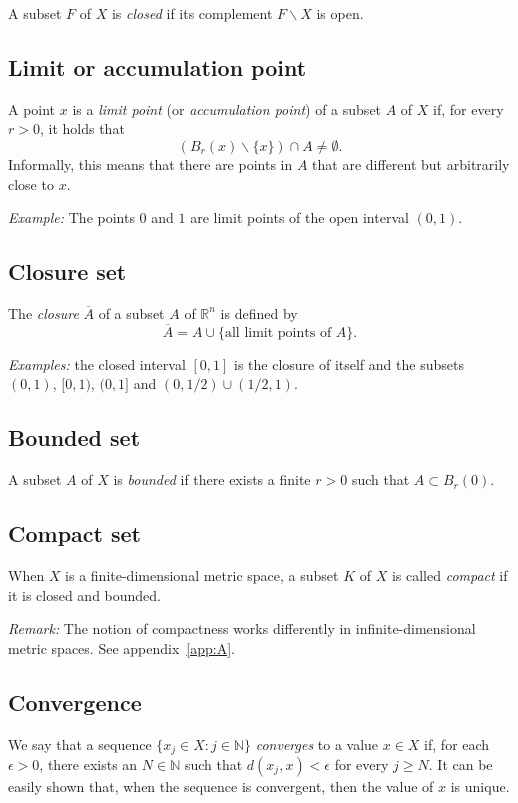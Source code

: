 \documentclass[aps,prl,twocolumn,groupedaddress]{revtex4-2}
\newcommand{\NN}{\mathbb{N}}
\newcommand{\RR}{\mathbb{R}}
\begin{document}
A subset $F$ of $X$ is {\em closed} if its complement $F\backslash X$ is open.

\subsection{
Limit or accumulation point
\label{sec:limit_point_metric}
}

A point $x$ is a {\em limit point} (or {\em accumulation point}) of a subset $A$ of $X$ if, for every $r>0$, it holds that
$$
(B_r(x)\backslash \{x\})\cap A \neq \emptyset.
$$
Informally, this means that there are points in $A$ that are different but arbitrarily close to $x$.

{\em Example:}
The points $0$ and $1$ are limit points of the open interval $(0,1)$.

\subsection{Closure set}

The {\em closure} $\overline{A}$ of a subset $A$ of $\RR^n$ is defined by
$$
\overline{A}
=
A \cup \{\mbox{all limit points of $A$}\}.
$$

{\em Examples:} the closed interval $[0,1]$ is the closure of itself and the subsets $(0,1)$, $[0,1)$, $(0,1]$ and $(0,1/2)\cup (1/2,1)$.

\subsection{Bounded set}

A subset $A$ of $X$ is {\em bounded} if there exists a finite $r>0$ such that $A \subset B_r(0)$.

\subsection{Compact set}

When $X$ is a finite-dimensional metric space, a subset $K$ of $X$ is called {\em compact} if it is closed and bounded.

{\color{red} 
{\em Remark:}
The notion of compactness works differently in infinite-dimensional metric spaces.
See appendix~\ref{app:A}.
}

\subsection{Convergence}

We say that a sequence $\{x_j\in X:j\in \NN\}$ {\em converges} to a value $x\in X$ if, for each $\epsilon>0$, there exists an $N\in \NN$ such that $d(x_j,x)<\epsilon$ for every $j\geq N$.
It can be easily shown that, when the sequence is convergent, then the value of $x$ is unique.
\end{document}

